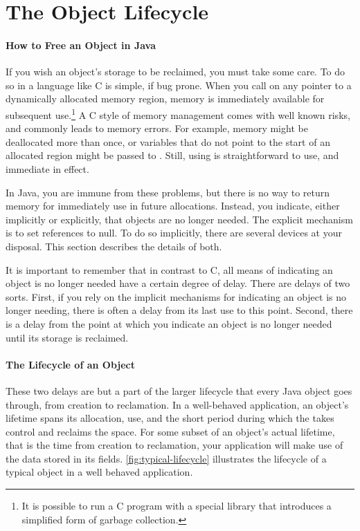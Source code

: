 \section{The Object Lifecycle}
\paragraph{How to Free an Object in Java}
\label{sec:natural-lifetime}

If you wish an object's storage to be reclaimed, you must take some care. To do
so in a language like C is simple, if bug prone. When you call  on any
pointer to a dynamically allocated memory region, memory is immediately available
for subsequent use.\footnote{It is possible to run a C program with a
special  library that introduces a simplified form of garbage
collection.} A C style of memory management comes with well known risks, and
commonly leads to memory errors. For example, memory might be deallocated more
than once, or variables that do not point to the start of an allocated region
might be passed to . Still, using  is straightforward to
use, and immediate in effect.

In Java, you are immune from these problems, but there is no way to return memory
for immediately use in future allocations. Instead, you indicate, either
implicitly or explicitly, that objects are no longer needed. The explicit
mechanism is to set references to null. To do so implicitly, there are several
devices at your disposal. This section describes the details of both.

It is important to remember that in contrast to C, all means of indicating an
object is no longer needed have a certain degree of delay. There are delays of
two sorts. First, if you rely on the implicit mechanisms for indicating an object is no
longer needing, there is often a delay from its last use to this point. Second,
there is a delay from the point at which you indicate an object is no longer
needed until its storage is reclaimed.

\paragraph{The Lifecycle of an Object}
These two delays are but a part of the larger lifecycle that every Java object
goes through, from creation to reclamation. In a well-behaved application, an
object's lifetime spans its allocation, use, and the short period during which
the \jre takes control and reclaims the space. For some subset of an object's
actual lifetime, that is the time from creation to reclamation, your application
will make use of the data stored in its fields. \autoref{fig:typical-lifecycle}
illustrates the lifecycle of a typical object in a well behaved application.

